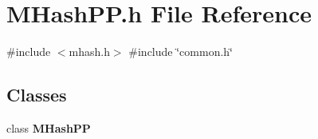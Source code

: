 \section{M\+Hash\+P\+P.\+h File Reference}
\label{MHashPP_8h}
{\ttfamily \#include $<$mhash.\+h$>$}\newline
{\ttfamily \#include \char`\"{}common.\+h\char`\"{}}\newline
\subsection*{Classes}
\begin{DoxyCompactItemize}
\item 
class \textbf{ M\+Hash\+PP}
\end{DoxyCompactItemize}
